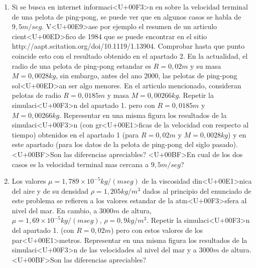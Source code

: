 \documentclass[12pt,a4paper]{article}
\begin{document}
\begin{enumerate}
\item
Si se busca en internet informaci<U+00F3>n en sobre la velocidad terminal de una pelota de ping-pong, se puede ver que en algunos casos se habla de $9,5m/seg$. V<U+00E9>ase por ejemplo el resumen de un articulo cient<U+00ED>fico de 1984 que se puede encontrar en el sitio http://aapt.scitation.org/doi/10.1119/1.13904. Comprobar hasta que punto coincide esto con el resultado obtenido en el apartado 2. En la actualidad, el radio de una pelota de ping-pong estandar es $R = 0,02 m$ y su masa $M = 0,0028 kg$, sin embargo, antes del ano 2000, las pelotas de ping-pong sol<U+00ED>an ser algo menores. En el articulo mencionado, consideran pelotas de radio $R = 0,0185m$ y masa $M = 0,00266kg$. Repetir la simulaci<U+00F3>n del apartado 1. pero con $R = 0,0185m$ y $M = 0,00266kg$. Representar en una misma figura los resultados de la simulaci<U+00F3>n (con gr<U+00E1>ficas de la velocidad con respecto al tiempo) obtenidos en el apartado 1 (para $R = 0,02m$ y $M = 0,0028 kg$) y en este apartado (para los datos de la pelota de ping-pong del siglo pasado). <U+00BF>Son las diferencias apreciables? <U+00BF>En cual de los dos casos es la velocidad terminal mas cercana a $9,5 m/seg$?

\item
Los valores $\mu = 1,789 \times 10^{-5} kg/(m seg)$ de la viscosidad din<U+00E1>nica del aire y de su densidad $\rho = 1,205 kg/m^{3}$ dados al principio del enunciado de este problema se refieren a los valores estandar de la atm<U+00F3>sfera al nivel del mar. En cambio, a $3000 m$ de altura, $\mu = 1,69 \times 10^{-5} kg/(m seg),\, \rho = 0,9 kg/m^{3}$. Repetir la simulaci<U+00F3>n del apartado 1. (con $R = 0,02 m$) pero con estos valores de los par<U+00E1>metros. Representar en una misma figura los resultados de la simulaci<U+00F3>n de las velocidades al nivel del mar y a $3000 m$ de altura. <U+00BF>Son las diferencias apreciables?

\end{enumerate}
\end{document}
